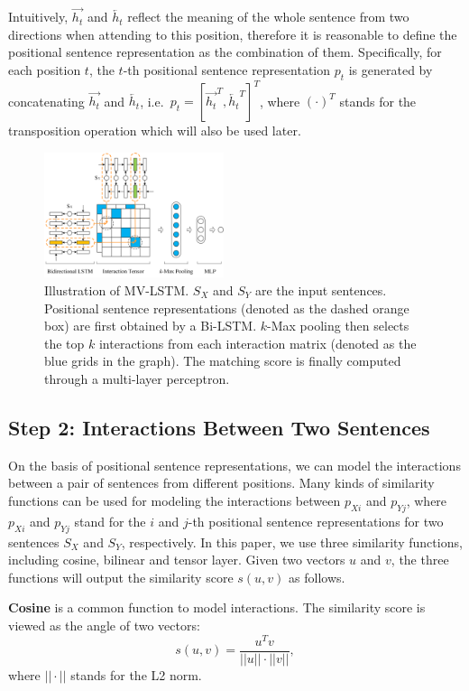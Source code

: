 \documentclass[letterpaper]{article}
\begin{document}
Intuitively, $\overrightarrow{h_t}$ and $\overleftarrow{h_t}$ reflect the meaning of the whole sentence from two directions when attending to this position, therefore it is reasonable to define the positional sentence representation as the combination of them. Specifically, for each position $t$, the $t$-th positional sentence representation $p_t$ is generated by concatenating $\overrightarrow{h_t}$ and $\overleftarrow{h_{t}}$, i.e.~$p_t=[\overrightarrow{h_t}^T,\overleftarrow{h_{t}}^T]^T$, where $(\cdot)^T$ stands for the transposition operation which will also be used later.
\begin{figure}[t]
\centering
\includegraphics[width=0.47\textwidth]{model.png}
\caption{Illustration of MV-LSTM. $S_X$ and $S_Y$ are the input sentences. Positional sentence representations (denoted as the dashed orange box) are first obtained by a Bi-LSTM. $k$-Max pooling then selects the top $k$ interactions from each interaction matrix (denoted as the blue grids in the graph). The matching score is finally computed through a multi-layer perceptron.}
\label{fig:model}
\end{figure}
\subsection{Step 2: Interactions Between Two Sentences}
On the basis of positional sentence representations, we can model the interactions between a pair of sentences from different positions. Many kinds of similarity functions can be used for modeling the interactions between $p_{Xi}$  and $p_{Yj}$, where $p_{Xi}$ and $p_{Yj}$ stand for the $i$ and $j$-th positional sentence representations for two sentences $S_X$ and $S_Y$, respectively. In this paper, we use three similarity functions, including cosine, bilinear and tensor layer. Given two vectors $u$ and $v$, the three functions will output the similarity score $s(u,v)$ as follows.

{\bf Cosine} is a common function to model interactions. The similarity score is viewed as the angle of two vectors:
\begin{equation*}
s(u,v)=\frac{u^Tv}{||u||\cdot||v||},
\end{equation*}
where $||\cdot||$ stands for the L2 norm.
\end{document}
